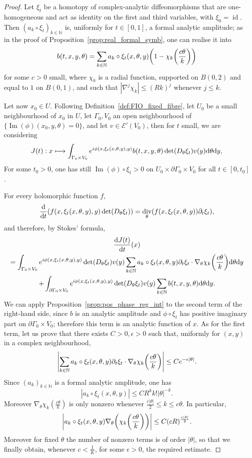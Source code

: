 \documentclass[10pt]{amsart}
\theoremstyle{definition}\newtheorem{defi}[theo]{Definition}\newtheorem{rema}[theo]{Remark}\newtheorem{exam}[theo]{Example}\newtheorem{exem}[theo]{Example}\newtheorem{nota}[theo]{Notation}
\DeclareMathOperator{\im}{Im}
\DeclareMathOperator{\divv}{div}
\DeclareMathOperator{\idd}{id}
\newcommand{\clE}{\mathcal{E}}
\newcommand\1{\mathds{1}}
\newcommand{\N}{\mathbb{N}}
\newcommand{\dd}{\mathrm{d}}
\let\oldmapsto\mapsto
\renewcommand*{\mapsto}{\mathchoice{\longmapsto}{\oldmapsto}{\oldmapsto}{\oldmapsto}}
\let\originalleft\left
\let\originalright\right
\renewcommand{\left}{\mathopen{}\mathclose\bgroup\originalleft}
\renewcommand{\right}{\aftergroup\egroup\originalright}
\begin{document}
\begin{proof}
Let $\xi_t$ be a homotopy of complex-analytic diffeomorphisms that are one-homogeneous and act as identity on the first and third variables, with $\xi_0=\idd$. Then $(a_k\circ \xi_t)_{k\in \N}$ is, uniformly for $t\in [0,1]$, a formal analytic amplitude; as in the proof of Proposition~\ref{prop:real_formal_symb}, one can realise it into
\[
b(t,x,y,\theta)=\sum_{k\in \N}a_k\circ
\xi_t(x,\theta,y)\left(1-\chi_k\left(\frac{c\theta}{k}\right)\right)
\]
for some $c>0$ small, where $\chi_k$ is a radial function, supported on $B(0,2)$ and equal to $1$ on $B(0,1)$, and such that $|\nabla^j\chi_k|\leq (Rk)^j$ whenever $j\leq k$.

Let now $x_0\in U$. Following Definition~\ref{def:FIO_fixed_fibre}, let $U_0$ be a small neighbourhood of $x_0$ in $U$, let $\Gamma_0,V_0$ an open neighbourhood of $\{\im(\phi)(x_0,y,\theta)=0\}$, and let $v\in \clE'(V_0)$, then for $t$ small, we are considering
\[
J(t):x\mapsto \int_{\Gamma_0\times V_0 } e^{i\phi(x,\xi_t(x,\theta,y),y)}b(t,x,y,\theta)\det(D_{\theta}\xi_t)v(y)\dd
\theta\dd y,
\]
For some $t_0>0$, one has still $\im(\phi)\circ \xi_t>0$ on $U_0\times \partial \Gamma_0\times V_0$ for all $t\in [0,t_0]$.

For every holomorphic function $f$,
\[
\frac{\dd}{\dd t}(f(x,\xi_t(x,\theta,y),y)\det(D_{\theta}\xi_t))=\divv_{\theta}\left(f(x,\xi_t(x,\theta,y))\partial_t\xi_t\right),
\]
and therefore, by Stokes' formula,
\begin{multline}\label{eq:Jprime}
\frac{\dd J(t)}{\dd t}(x)\\
=\int_{\Gamma_0\times V_0}e^{i\phi(x,\xi_t(x,\theta,y),y)}\det(D_{\theta}\xi_t)v(y)\sum_{k\in
\N}a_k\circ\xi_t(x,\theta,y) \partial_t\xi_t\cdot
\nabla_{\theta}\chi_k\left(\frac{c\theta}{k}\right)\dd
\theta \dd y\\
+\int_{\partial \Gamma_0\times V_0}e^{i\phi(x,\xi_t(x,\theta,y),y)}\det(D_{\theta}\xi_t)v(y)\sum_{k\in
\N}b(t,x,y,\theta)\dd
\theta \dd y.
\end{multline}
We can apply Proposition~\ref{prop:pos_phase_reg_int} to the second term of the right-hand side, since $b$ is an analytic amplitude and $\phi\circ\xi_t$ has positive imaginary part on $\partial \Gamma_0\times V_0$; therefore this term is an analytic function of $x$. As for the first term, let us prove that there exists $C>0, \epsilon>0$ such that, uniformly for $(x,y)$ in a complex neighbourhood,
\[
\left| \sum_{k\in
\N}a_k\circ\xi_t(x,\theta,y) \partial_t\xi_t\cdot
\nabla_{\theta}\chi_k\left(\frac{c\theta}{k}\right)\right|\leq Ce^{-\epsilon|\theta|}.
\]
Since $(a_k)_{k\in \N}$ is a formal analytic amplitude, one has
\[
|a_k\circ\xi_t(x,\theta,y)|\leq CR^kk!|\theta|^{-k}.
\]
Moreover $\nabla_{\theta}\chi_k(\frac{c\theta}{k})$ is only nonzero whenever $\frac{c|\theta|}{2}\leq k \leq c\theta$. In particular,
\[
\left|a_k\circ\xi_t(x,\theta,y)\nabla_{\theta}\left(\chi_k\left(\frac{c\theta}{k}\right)\right)\right|\leq C(cR)^{\frac{c|\theta|}{2}}.
\]
Moreover for fixed $\theta$ the number of nonzero terms is of order $|\theta|$, so that we finally obtain, whenever $c<\frac{1}{K}$, for some $\epsilon>0$, the required estimate.


\end{proof}
\end{document}
